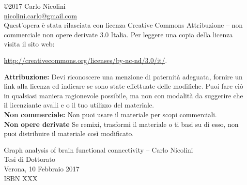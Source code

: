 \vspace*{\fill}
\begin{footnotesize}
\begin{centering}
\noindent \copyright 2017 Carlo Nicolini \\
\url{nicolini.carlo@gmail.com}\\
Quest’opera è stata rilasciata con licenza Creative Commons Attribuzione – non commerciale non opere derivate 3.0 Italia. Per leggere una copia della licenza visita il sito web:

\url{http://creativecommons.org/licenses/by-nc-nd/3.0/it/}.

\begin{flushleft}
\textbf{Attribuzione:} Devi riconoscere una menzione di paternità adeguata, fornire un link alla licenza ed indicare se sono state effettuate delle modifiche. Puoi fare ciò in qualsiasi maniera ragionevole possibile, ma non con modalità da suggerire che il licenziante avalli e o il tuo utilizzo del materiale.\\
\textbf{Non commerciale:}  Non puoi usare il materiale per scopi commerciali.\\\textbf{Non opere derivate} Se remixi, trasformi il materiale o ti basi su di esso, non puoi distribuire il materiale così modificato.
\end{flushleft}

Graph analysis of brain functional connectivity – Carlo Nicolini \\
Tesi di Dottorato\\
Verona, 10 Febbraio 2017 \\
ISBN XXX \\
\end{centering}
\end{footnotesize}
\thispagestyle{empty}